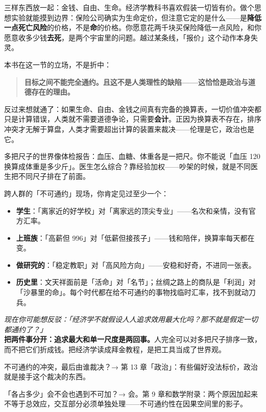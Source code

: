 \documentclass[../../main2.tex]{subfiles}
\begin{document}
三样东西放一起：金钱、自由、生命。经济学教科书喜欢假装一切皆有价。做个思想实验就能摸到边界：保险公司确实为生命定价，但注意它定的是什么——是\textbf{降低一点死亡风险}的价格，不是\textbf{命}的价格。你愿意花两千块买保险降低一点风险，和你愿意收多少钱\textbf{去死}，是两个宇宙里的问题。越过某条线，「报价」这个动作本身失灵。

本书在这一节的立场，不是折中：

\begin{quote}
	\textbf{目标之间不能完全通约。且这不是人类理性的缺陷——这恰恰是政治与道德存在的理由。}
\end{quote}

反过来想就通了：如果生命、自由、金钱之间真有完备的换算表，一切价值冲突都只是计算错误，人类就不需要道德争论，只需要\textbf{会计}。正因为换算表不存在，排序冲突才无解于算盘，人类才需要超出计算的装置来裁决——伦理是它，政治也是它。

\begin{tcolorbox}[colback=green!5, title=\textit{生活类比}]
	多把尺子的世界像体检报告：血压、血糖、体重各是一把尺。你不能说「血压 120 换算成体重是多少斤」。医生怎么综合？靠经验加权——吵架的时候，就是不同医生把不同尺子排在了前面。
\end{tcolorbox}

跨人群的「不可通约」现场，你肯定见过至少一个：

\begin{itemize}
	\item \textbf{学生}：「离家近的好学校」对「离家远的顶尖专业」——名次和亲情，没有官方汇率。
	\item \textbf{上班族}：「高薪但 996」对「低薪但接孩子」——钱和陪伴，换算率每天都在变。
	\item \textbf{做研究的}：「稳定教职」对「高风险方向」——安稳和好奇，不进同一张表。
	\item \textbf{历史里}：文天祥面前是「活命」对「名节」；丝绸之路上的商队是「利润」对「沙暴里的命」。每个时代都在给不可通约的事物找临时汇率，找不到就动刀兵。
\end{itemize}

\begin{questionbox}
	\textit{现在你可能想反驳：「经济学不就假设人人追求效用最大化吗？那不就是假定一切都通约了？」}\\
	\textbf{把两件事分开：追求最大和单一尺度是两回事。}人完全可以对多把尺子排序一致，而不把它们折成钱。把经济学读成拜金教程，是把工具当成了世界观。
\end{questionbox}

\begin{reader_anticipation}
	\item 不可通约的冲突，最后由谁裁决？→ 第 13 章「政治」：有些偏好没法标价，政治就是接手这个裁决的东西。
	\item 「各占多少」会不会也遇到不可加？→ 会。第 9 章和数学附录：两个原因加起来不等于总效应，交互部分必须单独处理——不可通约性在因果空间里的影子。
\end{reader_anticipation}
\end{document}
